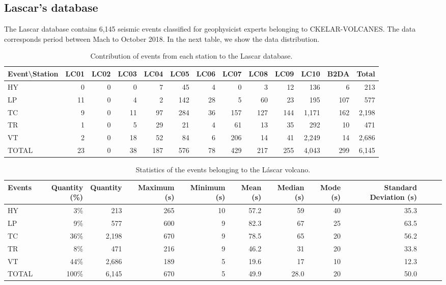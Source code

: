 \documentclass[journal]{IEEEtran}
\begin{document}
\subsection{Lascar's database}
The Lascar database contains 6,145 seismic events classified for geophysicist experts belonging to CKELAR-VOLCANES. The data corresponds period between Mach to October 2018. In the next table, we show the data distribution.
\begin{table}
\caption{Contribution of events from each station to the Lascar database.} %
\centering
\begin{adjustbox}{width=\textwidth}
\begin{tabular}{lrrrrrrrrrrrr}
\hline\hline %
Event\textbackslash{}Station & LC01 & LC02 & LC03 & LC04 & LC05 & LC06 & LC07 & LC08 & LC09 & LC10 & B2DA & Total \\
\hline %
HY & 0 & 0 & 0 & 7 & 45 & 4 & 0 & 3 & 12 & 136 & 6 & 213 \\
LP & 11 & 0 & 4 & 2 & 142 & 28 & 5 & 60 & 23 & 195 & 107 & 577 \\
TC & 9 & 0 & 11 & 97 & 284 & 36 & 157 & 127 & 144 & 1,171 & 162 & 2,198 \\
TR & 1 & 0 & 5 & 29 & 21 & 4 & 61 & 13 & 35 & 292 & 10 & 471 \\
VT & 2 & 0 & 18 & 52 & 84 & 6 & 206 & 14 & 41 & 2,249 & 14 & 2,686 \\
\hline %
TOTAL & 23 & 0 & 38 & 187 & 576 & 78 & 429 & 217 & 255 & 4,043 & 299 & 6,145 \\
\hline %
\end{tabular}
\end{adjustbox}
\label{table:lascar_database}
\end{table}

\begin{table}
\caption{Statistics of the events belonging to the Láscar volcano.} %
\centering
\begin{tabular}{lrrrrrrrrrrr}
\hline\hline %
  Events & Quantity (\%) & Quantity & Maximum (s) & Minimum (s) & Mean (s) & Median (s) & Mode (s) & Standard Deviation (s)  \\
\hline %
HY & 3\% & 213 & 265 & 10 & 57.2 & 59 & 40 & 35.3 \\
LP & 9\% & 577 & 600 & 9 & 82.3 & 67 & 25 & 63.5 \\
TC & 36\% & 2,198 & 670 & 9 & 78.5 & 65 & 20 & 56.2 \\
TR & 8\% & 471 & 216 & 9 & 46.2 & 31 & 20 & 33.8 \\
VT & 44\% & 2,686 & 189 & 5 & 19.6 & 17 & 10 & 12.3 \\
\hline %
TOTAL & 100\% & 6,145 & 670 & 5 & 49.9 & 28.0 & 20 & 50.0 \\
\hline %
\end{tabular}
\label{table:lascar_statistics}
\end{table}
\end{document}
